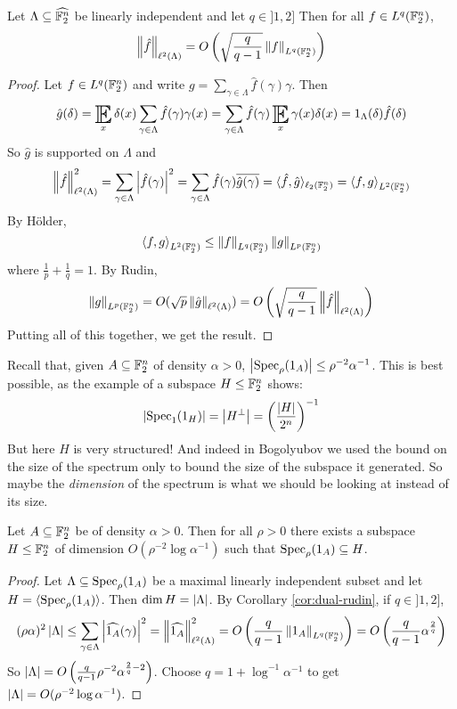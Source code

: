 \documentclass{article}
\begin{document}
\begin{cor}\label{cor:dual-rudin}
  Let $\Lambda \subseteq \widehat{\mathbb F_2^n}$ be linearly independent and let $q \in ]1, 2]$ Then for all $f \in L^q(\mathbb F_2^n)$,
  $$\left\lVert \hat f\right\rVert_{\ell^2(\Lambda)} = O\left(\sqrt{\frac q{q - 1}} \left\lVert f\right\rVert_{L^q(\mathbb F_2^n)}\right)$$
\end{cor}
\begin{proof}
  Let $f \in L^q(\mathbb F_2^n)$ and write $g = \sum_{\gamma \in \Lambda} \hat f(\gamma)\gamma$. Then
  $$\hat g(\delta) = \E_x \delta(x) \sum_{\gamma \in \Lambda} \hat f(\gamma) \gamma(x) = \sum_{\gamma \in \Lambda} \hat f(\gamma) \E_x \gamma(x)\delta(x) = 1_\Lambda(\delta) \hat f(\delta)$$
  So $\hat g$ is supported on $\Lambda$ and
  $$\left\lVert \hat f\right\rVert_{\ell^2(\Lambda)}^2 = \sum_{\gamma \in \Lambda} \left\lvert \hat f(\gamma)\right\rvert^2 = \sum_{\gamma \in \Lambda} \hat f(\gamma)\overline{\hat g(\gamma)} = \langle\hat f, \hat g\rangle_{\ell_2(\mathbb F_2^n)} = \left\langle f, g\right\rangle_{L^2(\mathbb F_2^n)}$$
  By Hölder,
  $$\left\langle f, g\right\rangle_{L^2(\mathbb F_2^n)} \le \left\lVert f\right\rVert_{L^q(\mathbb F_2^n)}\left\lVert g\right\rVert_{L^p(\mathbb F_2^n)}$$
  where $\frac 1p + \frac 1q = 1$. By Rudin,
  $$\left\lVert g\right\rVert_{L^p(\mathbb F_2^n)} = O(\sqrt p \left\lVert \hat g\right\rVert_{\ell^2(\Lambda)}) = O\left(\sqrt{\frac q{q - 1}} \left\lVert \hat f\right\rVert_{\ell^2(\Lambda)}\right)$$
  Putting all of this together, we get the result.
\end{proof}

Recall that, given $A \subseteq \mathbb F_2^n$ of density $\alpha > 0$, $\left\lvert \operatorname{Spec}_\rho(1_A)\right\rvert \le \rho^{-2}\alpha^{-1}$. This is best possible, as the example of a subspace $H \le \mathbb F_2^n$ shows:
$$\left\lvert \operatorname{Spec}_1(1_H)\right\rvert = \left\lvert H^\perp\right\rvert = \left(\frac{\left\lvert H\right\rvert}{2^n}\right)^{-1}$$
But here $H$ is very structured! And indeed in Bogolyubov we used the bound on the size of the spectrum only to bound the size of the subspace it generated. So maybe the {\it dimension} of the spectrum is what we should be looking at instead of its size.

\begin{thm}
  Let $A \subseteq \mathbb F_2^n$ be of density $\alpha > 0$. Then for all $\rho > 0$ there exists a subspace $H \le \mathbb F_2^n$ of dimension $O(\rho^{-2}\log\alpha^{-1})$ such that $\operatorname{Spec}_\rho(1_A) \subseteq H$.
\end{thm}
\begin{proof}
  Let $\Lambda \subseteq \operatorname{Spec}_\rho(1_A)$ be a maximal linearly independent subset and let $H = \langle\operatorname{Spec}_\rho(1_A)\rangle$. Then $\dim H = \left\lvert \Lambda\right\rvert$. By Corollary \ref{cor:dual-rudin}, if $q \in ]1, 2]$,
  $$(\rho\alpha)^2\left\lvert \Lambda\right\rvert \le \sum_{\gamma \in \Lambda} \left\lvert \widehat{1_A}(\gamma)\right\rvert^2 = \left\lVert \widehat{1_A}\right\rVert_{\ell^2(\Lambda)}^2 = O\left(\frac q{q - 1}\left\lVert 1_A\right\rVert_{L^q(\mathbb F_2^n)}\right) = O\left(\frac q{q - 1} \alpha^{\frac 2q}\right)$$
  So $\left\lvert \Lambda\right\rvert = O\left(\frac q{q - 1}\rho^{-2}\alpha^{\frac 2q - 2}\right)$. Choose $q = 1 + \log^{-1} \alpha^{-1}$ to get $\left\lvert \Lambda\right\rvert = O(\rho^{-2}\log\alpha^{-1})$.
\end{proof}
\end{document}

